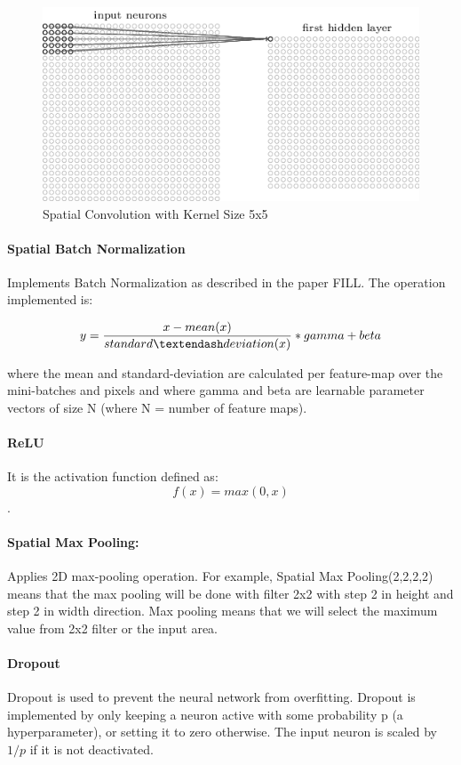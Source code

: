   \begin{figure}[h!]
  \centering
  \includegraphics[width=.4\textwidth]{images/spatialconv.png}
  \caption{Spatial Convolution with Kernel Size 5x5} \label{spatialconv}
  \vspace{-.5cm}
\end{figure}

\paragraph{Spatial Batch Normalization}

Implements Batch Normalization as described in the paper FILL. The operation implemented is:

 $$y=\frac{x - mean(x)}{standard \textendash deviation(x)} * gamma + beta$$
 
 where the mean and standard-deviation are calculated per feature-map over the mini-batches and pixels and where gamma and beta are learnable parameter vectors of size N (where N = number of feature maps).
 
 
 \paragraph{ReLU}
 It is the activation function defined as: $$f(x) = max(0,x)$$.
 
 
 \paragraph{Spatial Max Pooling:}
 Applies 2D max-pooling operation. For example, Spatial Max Pooling(2,2,2,2) means that the max pooling will be done with filter 2x2 with step 2 in height and step 2 in width direction. Max pooling means that we will select the maximum value from 2x2 filter or the input area.
 
 
 \paragraph{Dropout}
 Dropout is used to prevent the neural network from overfitting. Dropout is implemented by only keeping a neuron active with some probability p (a hyperparameter), or setting it to zero otherwise. The input neuron is scaled by $1/p$ if it is not deactivated.
 
